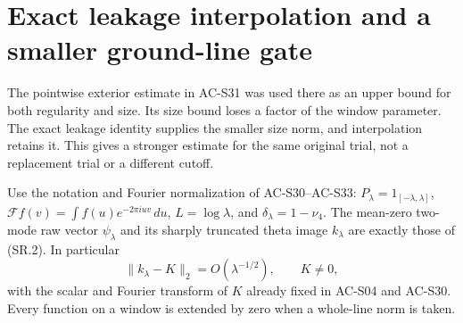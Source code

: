 \section{Exact leakage interpolation and a smaller ground-line gate}
\label{sec:spectral-prolate-leakage-interpolation}

The pointwise exterior estimate in AC-S31 was used there as an
upper bound for both regularity and size.  Its size bound loses a
factor of the window parameter.  The exact leakage identity supplies
the smaller size norm, and interpolation retains it.  This gives a
stronger estimate for the same original trial, not a replacement
trial or a different cutoff.

Use the notation and Fourier normalization of AC-S30--AC-S33:
\(P_\lambda=1_{[-\lambda,\lambda]}\),
\(\mathcal Ff(v)=\int f(u)e^{-2\pi iuv}\,du\),
\(L=\log\lambda\), and
\(\delta_\lambda=1-\nu_4\).  The mean-zero two-mode raw vector
\(\psi_\lambda\) and its sharply truncated theta image
\(k_\lambda\) are exactly those of (SR.2).  In particular
\[
        \|k_\lambda-K\|_2=O(\lambda^{-1/2}),
        \qquad K\ne0,
        \tag{LI.1}
\]
with the scalar and Fourier transform of \(K\) already fixed in
AC-S04 and AC-S30.  Every function on a window is extended by zero
when a whole-line norm is taken.

